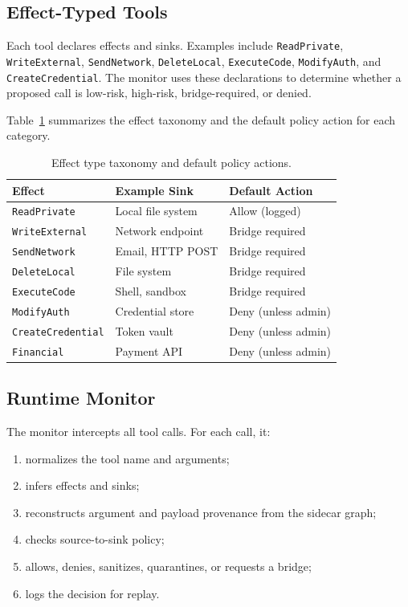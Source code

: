 \documentclass[sigconf,anonymous,review]{acmart}
\begin{document}
\subsection{Effect-Typed Tools}
\label{sec:effects}

Each tool declares effects and sinks. Examples include \texttt{ReadPrivate}, \texttt{WriteExternal}, \texttt{SendNetwork}, \texttt{DeleteLocal}, \texttt{ExecuteCode}, \texttt{ModifyAuth}, and \texttt{CreateCredential}. The monitor uses these declarations to determine whether a proposed call is low-risk, high-risk, bridge-required, or denied.

Table~\ref{tab:effect-types} summarizes the effect taxonomy and the default policy action for each category.

\begin{table}[t]
  \centering
  \caption{Effect type taxonomy and default policy actions.}
  \label{tab:effect-types}
  \begin{tabular}{@{}lll@{}}
    \toprule
    \textbf{Effect}        & \textbf{Example Sink}       & \textbf{Default Action} \\
    \midrule
    \texttt{ReadPrivate}    & Local file system           & Allow (logged)          \\
    \texttt{WriteExternal}  & Network endpoint            & Bridge required         \\
    \texttt{SendNetwork}    & Email, HTTP POST            & Bridge required         \\
    \texttt{DeleteLocal}    & File system                 & Bridge required         \\
    \texttt{ExecuteCode}    & Shell, sandbox              & Bridge required         \\
    \texttt{ModifyAuth}     & Credential store            & Deny (unless admin)     \\
    \texttt{CreateCredential} & Token vault              & Deny (unless admin)     \\
    \texttt{Financial}      & Payment API                 & Deny (unless admin)     \\
    \bottomrule
  \end{tabular}
\end{table}

\subsection{Runtime Monitor}
\label{sec:monitor}

The monitor intercepts all tool calls. For each call, it:
\begin{enumerate}
  \item normalizes the tool name and arguments;
  \item infers effects and sinks;
  \item reconstructs argument and payload provenance from the sidecar graph;
  \item checks source-to-sink policy;
  \item allows, denies, sanitizes, quarantines, or requests a bridge;
  \item logs the decision for replay.
\end{enumerate}
\end{document}
